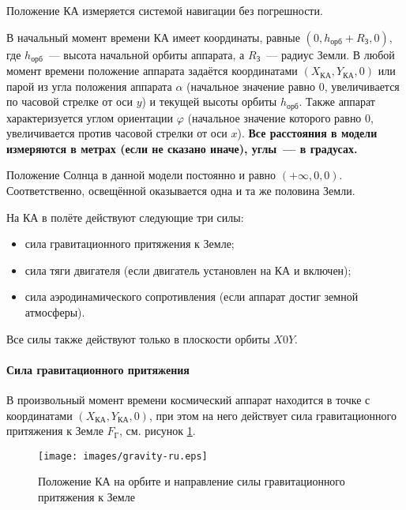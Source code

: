 \documentclass[12pt,a4paper]{article}
\begin{document}
Положение КА измеряется системой навигации без погрешности.

В начальный момент времени КА имеет координаты, равные $(0, h_{\text{орб}} + R_{\text{З}},
0)$, где $h_{\text{орб}}$~--– высота начальной орбиты аппарата, а $R_{\text{З}}$~--–
радиус Земли. В любой момент времени положение аппарата задаётся координатами
$(X_{\text{КА}}, Y_{\text{КА}}, 0)$ или парой из угла положения аппарата $\alpha$
(начальное значение равно 0, увеличивается по часовой стрелке от оси $y$) и текущей высоты орбиты
$h_{\text{орб}}$. Также аппарат характеризуется углом ориентации $\varphi$ (начальное значение
которого равно 0, увеличивается против часовой стрелки от оси $x$). \textbf{Все расстояния в модели
измеряются в метрах (если не сказано иначе), углы~--- в градусах.}

Положение Солнца в данной модели постоянно и равно $(+\infty, 0, 0)$. Соответственно, освещённой
оказывается одна и та же половина Земли.

На КА в полёте действуют следующие три силы:

\begin{itemize}
\item сила гравитационного притяжения к Земле;
\item сила тяги двигателя (если двигатель установлен на КА и включен);
\item сила аэродинамического сопротивления (если аппарат достиг земной атмосферы).
\end{itemize}

Все силы также действуют только в плоскости орбиты $X0Y$.

\paragraph{Сила гравитационного притяжения}

В произвольный момент времени космический аппарат находится в точке с координатами $(X_{\text{КА}},
Y_{\text{КА}}, 0)$, при этом на него действует сила гравитационного притяжения к Земле $F_{\text{Г}}$,
см. рисунок \ref{Pic:Gravity}.

\begin{figure}[tbh]
  \begin{center}
    \texttt{[image: images/gravity-ru.eps]}
    \caption{Положение КА на орбите и направление силы гравитационного притяжения к Земле}
    \label{Pic:Gravity}
  \end{center}
\end{figure}
\end{document}
